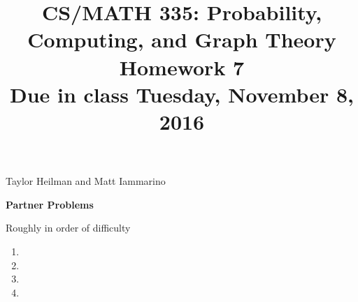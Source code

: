 \documentclass[11pt]{amsart}
\begin{document}
\title[CS/MATH 335 HW 7]{CS/MATH 335: Probability, Computing, and Graph Theory \\ Homework 7\\ Due in class Tuesday, November 8, 2016}
\maketitle

{Taylor Heilman and Matt Iammarino}

\textbf{Partner Problems}

Roughly in order of difficulty

\begin{enumerate}

\item {} 
{



}

\item {}

{


 
}

\item {}

{


 }
\item {}

{



}











\end{enumerate}
\end{document}
